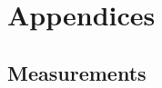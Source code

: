 \part{Appendices}
\label{Appendices}
\begin{appendices}



\chapter{Measurements}



\end{appendices}



